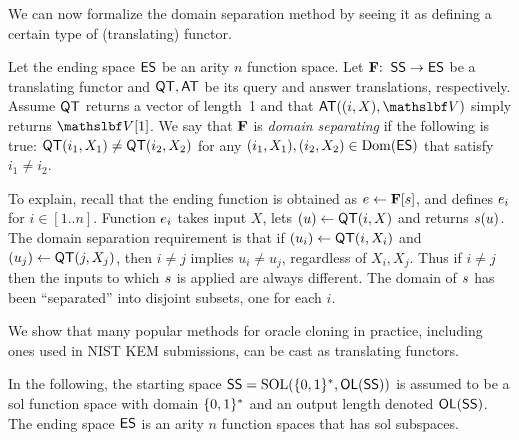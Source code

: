 



 We can now formalize the domain separation method by seeing it as defining a certain type of (translating) functor. 

Let the ending space $\mathsf{ES}$ be an arity $n$ function space. Let $\mathbf{F}  {:\;\;} \mathsf{SS}\to \mathsf{ES}$ be a translating functor and $\mathsf{QT},\mathsf{AT}$ be its query and answer translations, respectively. Assume $\mathsf{QT}$ returns a vector of length~1 and that $\AnT((i,X),\vecV)$ simply returns $\vecV[1]$. We say that $\mathbf{F}$ is \textit{domain separating} if the following is true: $\mathsf{QT}(i_1,X_1)\neq \mathsf{QT}(i_2,X_2)$ for any $(i_1,X_1),(i_2,X_2) \in \mathrm{Dom}(\mathsf{ES})$ that satisfy $i_1\neq i_2$. 

To explain, recall that the ending function is obtained as $e \gets \mathbf{F}[s]$, and defines $e_i$ for $i\in [1..n]$. Function $e_i$ takes input $X$, lets $(u)\gets\mathsf{QT}(i,X)$ and returns $s(u)$. The domain separation requirement is that if $(u_i)\gets\mathsf{QT}(i,X_i)$ and $(u_j)\gets\mathsf{QT}(j,X_j)$, then $i\neq j$ implies $u_i\neq u_j$, regardless of $X_i,X_j$. Thus if $i\neq j$ then the inputs to which $s$ is applied are always different. The domain of $s$ has been ``separated'' into disjoint subsets, one for each $i$. 

We show that many popular methods for oracle cloning in practice, including ones used in NIST KEM submissions, can be cast as translating functors. 



In the following, the starting space $\mathsf{SS} = \mathrm{SOL}(\{0,1\}^*,\mathsf{OL}(\mathsf{SS})) $ is assumed to be a sol function space with domain $\{0,1\}^*$ and an output length denoted $\mathsf{OL}(\mathsf{SS})$. The ending space $\mathsf{ES}$ is an arity $n$ function spaces that has sol subspaces. 

